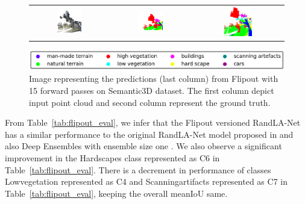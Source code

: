 \begin{figure}[h!]
\begin{tabular}{ccc}
            \includegraphics[width=0.33\textwidth, height=0.18\textheight]{images/seg_output/sem3d_seg_output/3_RGB.pdf} &
            \includegraphics[width=0.33\textwidth, height=0.18\textheight]{images/seg_output/sem3d_seg_output/3_GT.pdf}& 
            \includegraphics[width=0.33\textwidth, height=0.18\textheight]{images/seg_output/flipout/sem3d_3.pdf}\\
        \end{tabular}
        \includegraphics[scale=0.45]{images/legend.png}
        \caption{Image representing the predictions (last column) from Flipout with 15 forward passes on Semantic3D dataset.
        The first column depict input point cloud and second column represent the ground truth.}
        \label{fig:flipout_vis_sem3d}
    \end{figure}   

    From Table~\ref{tab:flipout_eval}, we infer that the Flipout versioned RandLA-Net has a similar performance to the original RandLA-Net model proposed in \cite{Hu_2020_CVPR_Randla} and also Deep Ensembles with ensemble size one .
    We also observe a significant improvement in the Hardscapes class represented as C6 in Table~\ref{tab:flipout_eval}.
    There is a decrement in performance of classes Lowvegetation represented as C4 and Scanningartifacts represented as C7 in Table~\ref{tab:flipout_eval}, keeping the overall meanIoU same.
    

